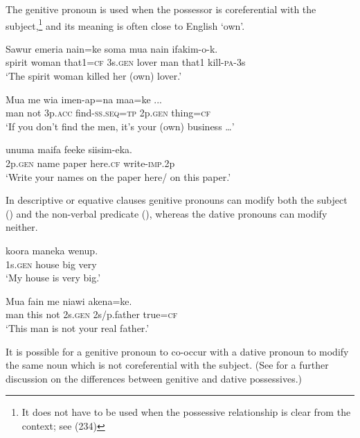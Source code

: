The genitive pronoun is used when the possessor is coreferential with the subject,\footnote{It does not have to be used when the possessive relationship is clear from the context; see (234)} and its meaning is often close to English `own'.

\ea%
\label{ex:x1805}
\gll Sawur emeria nain=ke  soma mua nain ifakim-o-k. \\
spirit woman that1=\textsc{cf} 3s.\textsc{gen} lover man that1 kill-\textsc{pa}-3s\\
\glt`The spirit woman killed her (own) lover.'
\z

\ea%
\label{ex:x1806}
\gll Mua me wia imen-ap=na  maa=ke ... \\
man not 3p.\textsc{acc} find-\textsc{ss}.\textsc{seq}=\textsc{tp} 2p.\textsc{gen} thing=\textsc{cf}\\
\glt`If you don't find the men, it's your (own) business {\dots}'
\z

\ea%
\label{ex:x567}
\gll {} unuma maifa feeke siisim-eka. \\
2p.\textsc{gen} name paper here.\textsc{cf} write-\textsc{imp}.2p\\
\glt`Write your names on the paper here/ on this paper.'
\z

In descriptive or equative clauses genitive pronouns can modify both the subject  () and the non-verbal predicate  (), whereas the dative pronouns can modify neither. 

\ea%
\label{ex:x568}
\gll {} koora maneka wenup. \\
1s.\textsc{gen} house big very\\
\glt`My house is very big.'
\z

\ea%
\label{ex:x569}
\gll Mua fain me  niawi akena=ke. \\
man this not 2s.\textsc{gen} 2s/p.father true=\textsc{cf}\\
\glt`This man is not your real father.'
\z

It is possible for a genitive pronoun to co-occur with a dative pronoun to modify the same noun which is not coreferential with the subject. (See  for a further discussion on the differences between genitive and dative possessives.)

